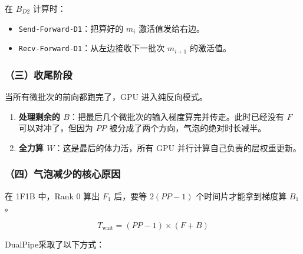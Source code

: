 在 \(B_{D2}\) 计算时：

\begin{itemize}
\item
  \texttt{Send-Forward-D1}：把算好的 \(m_i\) 激活值发给右边。
\item
  \texttt{Recv-Forward-D1}：从左边接收下一批次 \(m_{i+1}\) 的激活值。
\end{itemize}

\hypertarget{ux4e09ux6536ux5c3eux9636ux6bb5}{%
\subsubsection{（三）收尾阶段}\label{ux4e09ux6536ux5c3eux9636ux6bb5}}

当所有微批次的前向都跑完了，GPU 进入纯反向模式。

\begin{enumerate}
\def\labelenumi{\arabic{enumi}.}
\tightlist
\item
  \textbf{处理剩余的 \(B\)}：把最后几个微批次的输入梯度算完并传走。此时已经没有 \(F\) 可以对冲了，但因为 \(PP\) 被分成了两个方向，气泡的绝对时长减半。
\item
  \textbf{全力算 \(W\)}：这是最后的体力活，所有 GPU 并行计算自己负责的层权重更新。
\end{enumerate}

\hypertarget{ux56dbux6c14ux6ce1ux51cfux5c11ux7684ux6838ux5fc3ux539fux56e0}{%
\subsubsection{（四）气泡减少的核心原因}\label{ux56dbux6c14ux6ce1ux51cfux5c11ux7684ux6838ux5fc3ux539fux56e0}}

在 1F1B 中，Rank 0 算出 \(F_1\) 后，要等 \(2(PP - 1)\) 个时间片才能拿到梯度算 \(B_1\)。

\[
T_{\mathrm{wait}} = (PP - 1) \times (F + B)
\]

DualPipe采取了以下方式：

